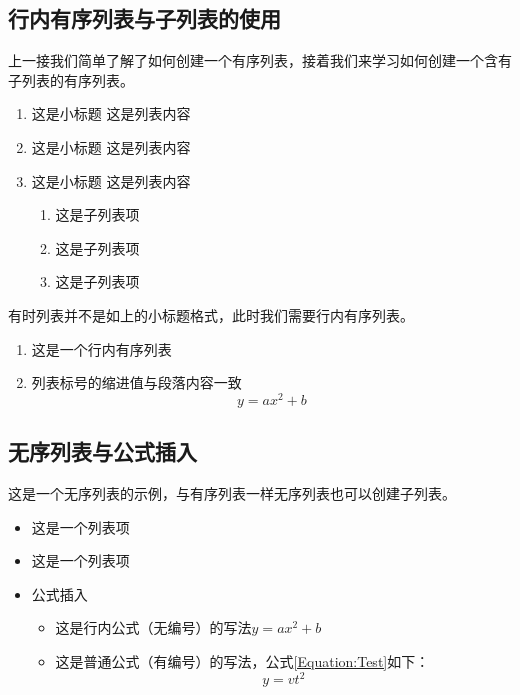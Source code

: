 \documentclass{bjfu}
\begin{document}
\subsection{行内有序列表与子列表的使用}
上一接我们简单了解了如何创建一个有序列表，接着我们来学习如何创建一个含有子列表的有序列表。
\begin{enumerate}[labelsep = .5em, leftmargin = 0pt, itemindent = 3em]
    \item 这是小标题 %
    \setlength{\parindent}{2em}这是列表内容

    \item 这是小标题 %
    \setlength{\parindent}{2em}这是列表内容

    \item 这是小标题 %
    \setlength{\parindent}{2em}这是列表内容
    \begin{enumerate}[itemindent=2em]
        \item 这是子列表项 
        \item 这是子列表项 
        \item 这是子列表项 
    \end{enumerate}
\end{enumerate}
有时列表并不是如上的小标题格式，此时我们需要行内有序列表。
\begin{enumerate}[fullwidth,itemindent=2em]
    \item 这是一个行内有序列表
    \item 列表标号的缩进值与段落内容一致
    \begin{equation}
        y=ax^2+b
    \end{equation}
\end{enumerate}


\subsection{无序列表与公式插入}
这是一个无序列表的示例，与有序列表一样无序列表也可以创建子列表。
\begin{itemize}
    \item 这是一个列表项
    \item 这是一个列表项
    \item 公式插入
    \begin{itemize}
        \item 这是行内公式（无编号）的写法$y=ax^2+b$
        \item 这是普通公式（有编号）的写法，公式\ref{Equation:Test}如下：
        \begin{equation}
            y=vt^2
            \label{Equation:Test}
        \end{equation}
    \end{itemize}
    
\end{itemize}
\end{document}

